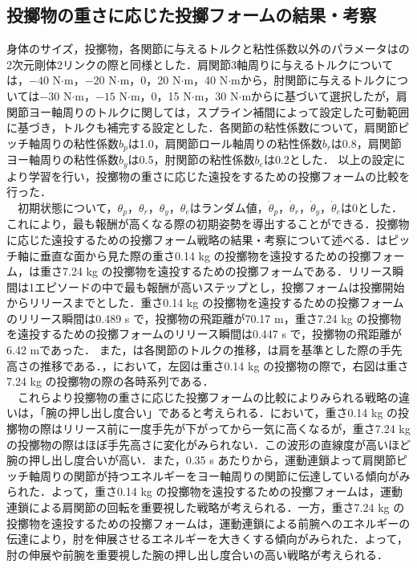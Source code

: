 \begin{small}
\subsection{投擲物の重さに応じた投擲フォームの結果・考察}
身体のサイズ，投擲物，各関節に与えるトルクと粘性係数以外のパラメータはの2次元剛体2リンクの際と同様とした．肩関節3軸周りに与えるトルクについては，$-40$ N$\cdot$m，$-20$ N$\cdot$m，0，20 N$\cdot$m，40 N$\cdot$mから，肘関節に与えるトルクについては$-30$ N$\cdot$m，$-15$ N$\cdot$m，0，15 N$\cdot$m，30 N$\cdot$mからに基づいて選択したが，肩関節ヨー軸周りのトルクに関しては，スプライン補間によって設定した可動範囲に基づき，トルクも補完する設定とした．各関節の粘性係数について，肩関節ピッチ軸周りの粘性係数$b_{p}$は1.0，肩関節ロール軸周りの粘性係数$b_{r}$は0.8，肩関節ヨー軸周りの粘性係数$b_{y}$は0.5，肘関節の粘性係数$b_{e}$は0.2とした．
以上の設定により学習を行い，投擲物の重さに応じた遠投をするための投擲フォームの比較を行った．\\
　初期状態について，$\theta_{p}$，$\theta_{r}$，$\theta_{y}$，$\theta_{e}$はランダム値，$\dot{\theta}_{p}$，$\dot{\theta}_{r}$，$\dot{\theta}_{y}$，$\dot{\theta}_{e}$は0とした．これにより，最も報酬が高くなる際の初期姿勢を導出することができる．投擲物に応じた遠投するための投擲フォーム戦略の結果・考察について述べる．はピッチ軸に垂直な面から見た際の重さ0.14 kg の投擲物を遠投するための投擲フォーム，は重さ7.24 kg の投擲物を遠投するための投擲フォームである．リリース瞬間は1エピソードの中で最も報酬が高いステップとし，投擲フォームは投擲開始からリリースまでとした．重さ0.14 kg の投擲物を遠投するための投擲フォームのリリース瞬間は0.489 s で，投擲物の飛距離が70.17 m，重さ7.24 kg の投擲物を遠投するための投擲フォームのリリース瞬間は0.447 s で，投擲物の飛距離が6.42 mであった．
また，は各関節のトルクの推移，は肩を基準とした際の手先高さの推移である．，において，左図は重さ0.14 kg の投擲物の際で，右図は重さ7.24 kg の投擲物の際の各時系列である．\\
　これらより投擲物の重さに応じた投擲フォームの比較によりみられる戦略の違いは，「腕の押し出し度合い」であると考えられる．において，重さ0.14 kg の投擲物の際はリリース前に一度手先が下がってから一気に高くなるが，重さ7.24 kg の投擲物の際はほぼ手先高さに変化がみられない．この波形の直線度が高いほど腕の押し出し度合いが高い．また，0.35 s あたりから，運動連鎖よって肩関節ピッチ軸周りの関節が持つエネルギーをヨー軸周りの関節に伝達している傾向がみられた．よって，重さ0.14 kg の投擲物を遠投するための投擲フォームは，運動連鎖による肩関節の回転を重要視した戦略が考えられる．一方，重さ7.24 kg の投擲物を遠投するための投擲フォームは，運動連鎖による前腕へのエネルギーの伝達により，肘を伸展させるエネルギーを大きくする傾向がみられた．よって，肘の伸展や前腕を重要視した腕の押し出し度合いの高い戦略が考えられる．

\end{small}

